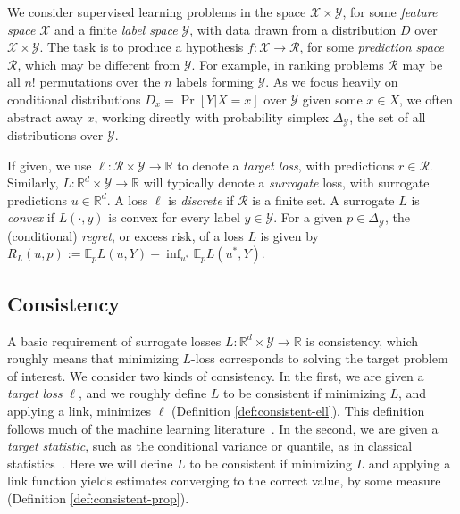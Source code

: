 \documentclass{article}
\newcommand{\Comments}{1}
\newcommand{\mynote}[2]{\ifnum\Comments=1\textcolor{#1}{#2}\fi}
\newcommand{\jessie}[1]{\mynote{purple}{[JF: #1]}}
\newcommand{\bo}[1]{\mynote{blue}{[Bo: #1]}}
\newcommand{\reals}{\mathbb{R}}
\newcommand{\simplex}{\Delta_\Y}
\newcommand{\E}{\mathbb{E}}
\newcommand{\R}{\mathcal{R}}
\newcommand{\X}{\mathcal{X}}
\newcommand{\Y}{\mathcal{Y}}
\newcommand{\exploss}[3]{\E_{#3} #1(#2,Y)}
\begin{document}
We consider supervised learning problems in the space $\X \times \Y$, for some \emph{feature space} $\X$ and a finite \emph{label space} $\Y$, with data drawn from a distribution $D$ over $\X \times \Y$.
The task is to produce a hypothesis $f: \X \to \R$, for some \emph{prediction space} $\R$, which may be different from $\Y$.
For example, in ranking problems $\R$ may be all $n!$ permutations over the $n$ labels forming $\Y$.
As we focus heavily on conditional distributions $D_x = \Pr[Y|X=x]$ over $\Y$ given some $x \in X$, we often abstract away $x$, working directly with probability simplex $\simplex$, the set of all distributions over $\Y$.

If given, we use $\ell: \R \times \Y \to \reals$ to denote a \emph{target loss}, with predictions $r\in\R$.
Similarly, $L: \reals^d \times \Y \to \reals$ will typically denote a \emph{surrogate} loss, with surrogate predictions $u \in \reals^d$.
A loss $\ell$ is \emph{discrete} if $\R$ is a finite set.
A surrogate $L$ is \emph{convex} if $L(\cdot,y)$ is convex for every label $y \in \Y$.
For a given $p\in\simplex$, the (conditional) \emph{regret}, or excess risk, of a loss $L$ is given by $R_L(u,p) := \exploss{L}{u}{p} - \inf_{u^*} \exploss{L}{u^*}{p}$.




\subsection{Consistency} \label{subsec:consistency}


A basic requirement of surrogate losses $L: \reals^d \times \Y \to \reals$ is consistency, which roughly means that minimizing $L$-loss corresponds to solving the target problem of interest.
We consider two kinds of consistency.
In the first, we are given a \emph{target loss} $\ell$, and we roughly define $L$ to be consistent if minimizing $L$, and applying a link, minimizes $\ell$ (Definition \ref{def:consistent-ell}).
This definition follows much of the machine learning literature~\citep{zhang2004statistical,bartlett2006convexity,tewari2007consistency,steinwart2007compare,ramaswamy2016convex}.
In the second, we are given a \emph{target statistic}, such as the conditional variance or quantile, as in classical statistics~\citep{fisher1922mathematical}.
Here we will define $L$ to be consistent if minimizing $L$ and applying a link function yields estimates converging to the correct value, by some measure (Definition \ref{def:consistent-prop}).
\end{document}
